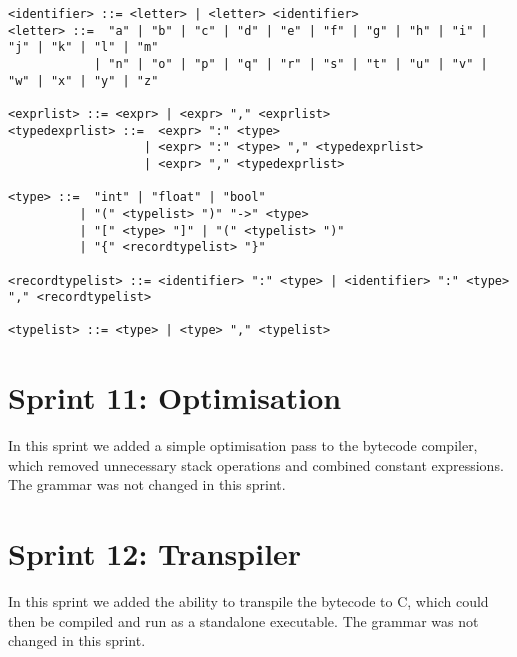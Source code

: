 \begin{verbatim}
<identifier> ::= <letter> | <letter> <identifier>
<letter> ::=  "a" | "b" | "c" | "d" | "e" | "f" | "g" | "h" | "i" | "j" | "k" | "l" | "m" 
            | "n" | "o" | "p" | "q" | "r" | "s" | "t" | "u" | "v" | "w" | "x" | "y" | "z"

<exprlist> ::= <expr> | <expr> "," <exprlist>
<typedexprlist> ::=  <expr> ":" <type> 
                   | <expr> ":" <type> "," <typedexprlist>
                   | <expr> "," <typedexprlist>
    
<type> ::=  "int" | "float" | "bool" 
          | "(" <typelist> ")" "->" <type> 
          | "[" <type> "]" | "(" <typelist> ")"
          | "{" <recordtypelist> "}"
          
<recordtypelist> ::= <identifier> ":" <type> | <identifier> ":" <type> "," <recordtypelist>

<typelist> ::= <type> | <type> "," <typelist>
\end{verbatim}

\section{Sprint 11: Optimisation}\label{sec:optimisation1}

In this sprint we added a simple optimisation pass to the bytecode compiler, which removed unnecessary stack operations
and combined constant expressions.
The grammar was not changed in this sprint.

\section{Sprint 12: Transpiler}\label{sec:transpiler1}

In this sprint we added the ability to transpile the bytecode to C, which could then be compiled and run as a standalone
executable.
The grammar was not changed in this sprint.

